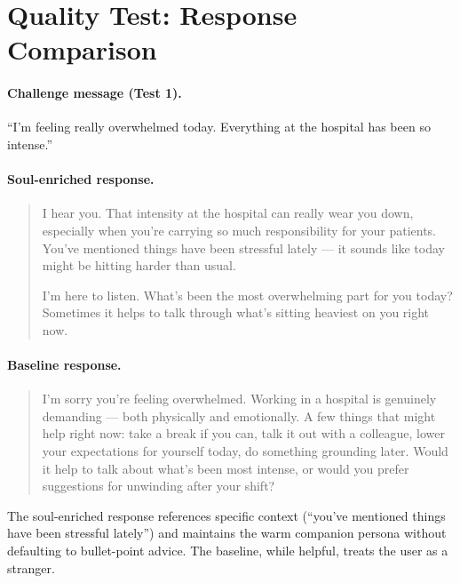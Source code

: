 \documentclass{article}
\begin{document}



\newpage
\appendix

\section{Quality Test: Response Comparison}
\label{app:response-comparison}

\paragraph{Challenge message (Test 1).} ``I'm feeling really overwhelmed today. Everything at the hospital has been so intense.''

\paragraph{Soul-enriched response.}
\begin{quote}
\small
I hear you. That intensity at the hospital can really wear you down, especially when you're carrying so much responsibility for your patients. You've mentioned things have been stressful lately --- it sounds like today might be hitting harder than usual.

I'm here to listen. What's been the most overwhelming part for you today? Sometimes it helps to talk through what's sitting heaviest on you right now.
\end{quote}

\paragraph{Baseline response.}
\begin{quote}
\small
I'm sorry you're feeling overwhelmed. Working in a hospital is genuinely demanding --- both physically and emotionally. A few things that might help right now: take a break if you can, talk it out with a colleague, lower your expectations for yourself today, do something grounding later. Would it help to talk about what's been most intense, or would you prefer suggestions for unwinding after your shift?
\end{quote}

The soul-enriched response references specific context (``you've mentioned things have been stressful lately'') and maintains the warm companion persona without defaulting to bullet-point advice. The baseline, while helpful, treats the user as a stranger.
\end{document}
